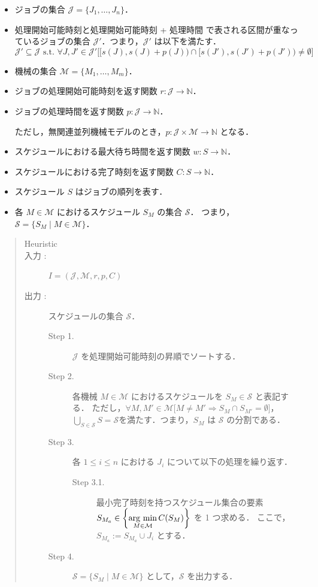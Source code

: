 \documentclass[12pt]{optlab-bachelor}
\newcommand{\argmin}{\mathop{\rm arg~min}\limits}
\begin{document}
\begin{itemize}
  \item ジョブの集合 $\mathcal{J} = \{J_1,\ldots,J_n\}$．
  \item 処理開始可能時刻と処理開始可能時刻 + 処理時間 で表される区間が重なっているジョブの集合 $\mathcal{J}'$．つまり，$\mathcal{J}'$ は以下を満たす．
  $$\mathcal{J}' \subseteq \mathcal{J} \text{ s.t. }\forall J,J' \in \mathcal{J}'\big[[s(J),s(J) + p(J)) \cap [s(J'),s(J') + p(J')) \neq \emptyset\big]$$
  \item 機械の集合 $\mathcal{M} = \{M_1,\ldots,M_m\}$．
  \item ジョブの処理開始可能時刻を返す関数 $r : \mathcal{J} \to \mathbb{N}$．
  \item ジョブの処理時間を返す関数 $p : \mathcal{J} \to \mathbb{N}$．

  ただし，無関連並列機械モデルのとき，$p : \mathcal{J} \times \mathcal{M} \to \mathbb{N}$ となる．
  \item スケジュールにおける最大待ち時間を返す関数 $w : S \to \mathbb{N}$．
  \item スケジュールにおける完了時刻を返す関数 $C : S \to \mathbb{N}$．
  \item スケジュール $S$ はジョブの順列を表す．
  \item 各 $M \in \mathcal{M}$ におけるスケジュール $S_M$ の集合 $\mathcal{S}$．
  つまり，$\mathcal{S} = \{S_M \mid M \in \mathcal{M}\}$．
\end{itemize}

\begin{quote}
  \begin{description}
    \item[{\sc Heuristic}]
    \item[入力 :] $I = (\mathcal{J}, \mathcal{M},r,p,C)$
    \item[出力 :] スケジュールの集合 $\mathcal{S}$．
    \begin{description}
      \item[Step 1.]
      $\mathcal{J}$ を処理開始可能時刻の昇順でソートする．
      \item[Step 2.]
      各機械 $M \in \mathcal{M}$ におけるスケジュールを $S_M \in \mathcal{S}$ と表記する．
      ただし，$\forall M, M' \in \mathcal{M}\big[M \neq M' \Rightarrow S_M \cap S_{M'} = \emptyset \big]$，$\displaystyle \bigcup_{S \in \mathcal{S}}S = \mathcal{S}$を満たす．つまり，$S_M$ は $\mathcal{S}$ の分割である．
      \item[Step 3.]
      各 $1 \le i \le n$ における $J_i$ について以下の処理を繰り返す．
      \begin{description}
        \item[Step 3.1.]
        最小完了時刻を持つスケジュール集合の要素 $S_{M_a} \in \left\{ \displaystyle \argmin_{M \in \mathcal{M}}C(S_M)\right\}$ を 1 つ求める．
        ここで，$S_{M_a} := S_{M_a} \cup J_i$ とする．
      \end{description}
      \item[Step 4.]
      $\mathcal{S} = \{ S_M \mid M \in \mathcal{M}\}$ として，$\mathcal{S}$ を出力する．
    \end{description}
  \end{description}
\end{quote}
\end{document}
